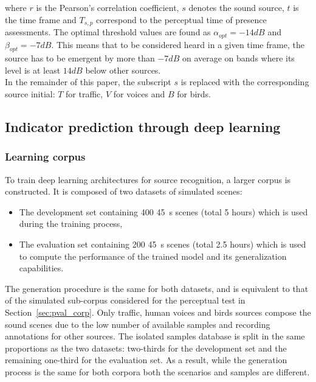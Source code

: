 \documentclass[11pt,a4paper]{article}
\begin{document}
where $r$ is the Pearson's correlation coefficient, $s$ denotes the sound source, $t$ is the time frame and $T_{s, p}$ correspond to the perceptual time of presence assessments. The optimal threshold values are found as $\alpha_{opt} = -14dB$ and $\beta_{opt} = -7dB$. This means that to be considered heard in a given time frame, the source has to be emergent by more than $-7dB$ on average on bands where its level is at least $14dB$ below other sources.\\

In the remainder of this paper, the subscript $s$ is replaced with the corresponding source initial: $T$ for traffic, $V$ for voices and $B$ for birds.


\subsection{Indicator prediction through deep learning}
\label{sec:deep}

\subsubsection{Learning corpus}
\label{sec:deep_corp}

To train deep learning architectures for source recognition, a larger corpus is constructed. It is composed of two datasets of simulated scenes:
\begin{itemize}
\item The development set containing 400 45~s scenes (total 5 hours) which is used during the training process,
\item The evaluation set containing 200 45~s scenes (total 2.5 hours) which is used to compute the performance of the trained model and its generalization capabilities.
\end{itemize}

The generation procedure is the same for both datasets, and is equivalent to that of the simulated sub-corpus considered for the perceptual test in Section~\ref{sec:pval_corp}. Only traffic, human voices and birds sources compose the sound scenes due to the low number of available samples and recording annotations for other sources. The isolated samples database is split in the same proportions as the two datasets: two-thirds for the development set and the remaining one-third for the evaluation set. As a result, while the generation process is the same for both corpora both the scenarios and samples are different.\\
\end{document}
